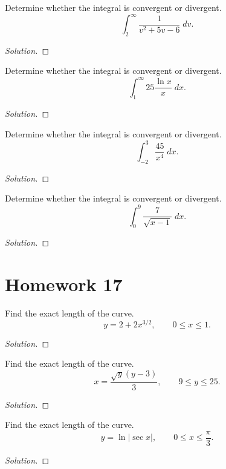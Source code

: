 \begin{problem}[WebAssign, HW 16, \# 6]
Determine whether the integral is convergent or divergent.
\[
\int_2^\infty\frac{1}{v^2+5v-6}\;dv.
\]
\end{problem}
\begin{proof}[Solution]
\end{proof}

\begin{problem}[WebAssign, HW 16, \# 7]
Determine whether the integral is convergent or divergent.
\[
\int_1^\infty 25\frac{\ln x}{x}\;dx.
\]
\end{problem}
\begin{proof}[Solution]
\end{proof}

\begin{problem}[WebAssign, HW 16, \# 8]
Determine whether the integral is convergent or divergent.
\[
\int_{-2}^3\frac{45}{x^4}\;dx.
\]
\end{problem}
\begin{proof}[Solution]
\end{proof}

\begin{problem}[WebAssign, HW 16, \# 9]
Determine whether the integral is convergent or divergent.
\[
\int_0^9\frac{7}{\sqrt{x-1}}\;dx.
\]
\end{problem}
\begin{proof}[Solution]
\end{proof}

\section{Homework 17}
\begin{problem}[WebAssign, HW 17, \# 1]
Find the exact length of the curve.
\[
y=2+2x^{3/2},\qquad 0\leq x\leq 1.
\]
\end{problem}
\begin{proof}[Solution]
\end{proof}

\begin{problem}[WebAssign, HW 17, \# 2]
Find the exact length of the curve.
\[
x=\frac{\sqrt{y}(y-3)}{3},\qquad 9\leq y\leq 25.
\]
\end{problem}
\begin{proof}[Solution]
\end{proof}

\begin{problem}[WebAssign, HW 17, \# 3]
Find the exact length of the curve.
\[
y=\ln|\sec x|,\qquad 0\leq x\leq\frac{\pi}{3}.
\]
\end{problem}
\begin{proof}[Solution]
\end{proof}

